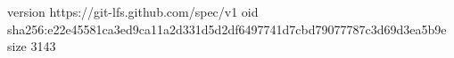 version https://git-lfs.github.com/spec/v1
oid sha256:e22e45581ca3ed9ca11a2d331d5d2df6497741d7cbd79077787c3d69d3ea5b9e
size 3143

